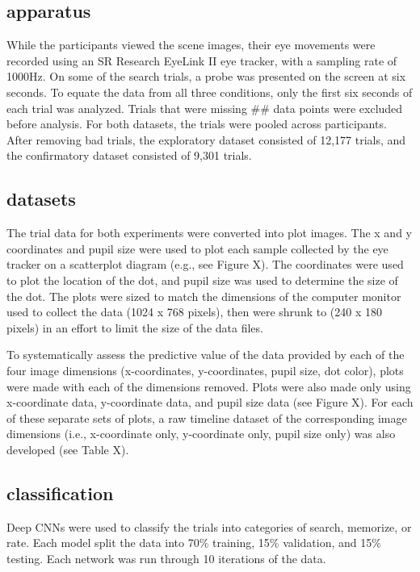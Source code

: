 \subsection{apparatus}
While the participants viewed the scene images, their eye movements were recorded using an SR Research EyeLink II eye tracker, with a sampling rate of 1000Hz. On some of the search trials, a probe was presented on the screen at six seconds. To equate the data from all three conditions, only the first six seconds of each trial was analyzed. Trials that were missing ## data points were excluded before analysis. For both datasets, the trials were pooled across participants. After removing bad trials, the exploratory dataset consisted of 12,177 trials, and the confirmatory dataset consisted of 9,301 trials.

\subsection{datasets}
The trial data for both experiments were converted into plot images. The x and y coordinates and pupil size were used to plot each sample collected by the eye tracker on a scatterplot diagram (e.g., see Figure X). The coordinates were used to plot the location of the dot, and pupil size was used to determine the size of the dot. The plots were sized to match the dimensions of the computer monitor used to collect the data (1024 x 768 pixels), then were shrunk to (240 x 180 pixels) in an effort to limit the size of the data files.


To systematically assess the predictive value of the data provided by each of the four image dimensions (x-coordinates, y-coordinates, pupil size, dot color), plots were made with each of the dimensions removed. Plots were also made only using x-coordinate data, y-coordinate data, and pupil size data (see Figure X). For each of these separate sets of plots, a raw timeline dataset of the corresponding image dimensions (i.e., x-coordinate only, y-coordinate only, pupil size only) was also developed (see Table X).


\subsection{classification}
Deep CNNs were used to classify the trials into categories of search, memorize, or rate. Each model split the data into 70\% training, 15\% validation, and 15\% testing. Each network was run through 10 iterations of the data.

